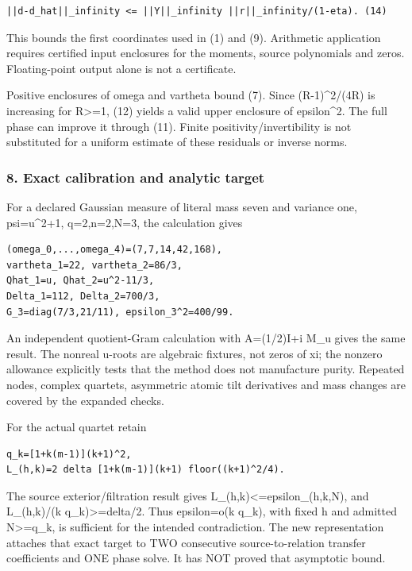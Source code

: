 \begin{verbatim}
||d-d_hat||_infinity <= ||Y||_infinity ||r||_infinity/(1-eta). (14)
\end{verbatim}

This bounds the first coordinates used in (1) and (9). Arithmetic application requires certified input enclosures for the moments, source polynomials and zeros. Floating-point output alone is not a certificate.

Positive enclosures of omega and vartheta bound (7). Since (R-1)\^{}2/(4R) is increasing for R\textgreater=1, (12) yields a valid upper enclosure of epsilon\^{}2. The full phase can improve it through (11). Finite positivity/invertibility is not substituted for a uniform estimate of these residuals or inverse norms.

\subsubsection{8. Exact calibration and analytic target}\label{endpoint-pr24_original--exact-calibration-and-analytic-target}

For a declared Gaussian measure of literal mass seven and variance one, psi=u\^{}2+1, q=2,n=2,N=3, the calculation gives

\begin{verbatim}
(omega_0,...,omega_4)=(7,7,14,42,168),
vartheta_1=22, vartheta_2=86/3,
Qhat_1=u, Qhat_2=u^2-11/3,
Delta_1=112, Delta_2=700/3,
G_3=diag(7/3,21/11), epsilon_3^2=400/99.
\end{verbatim}

An independent quotient-Gram calculation with A=(1/2)I+i M\_u gives the same result. The nonreal u-roots are algebraic fixtures, not zeros of xi; the nonzero allowance explicitly tests that the method does not manufacture purity. Repeated nodes, complex quartets, asymmetric atomic tilt derivatives and mass changes are covered by the expanded checks.

For the actual quartet retain

\begin{verbatim}
q_k=[1+k(m-1)](k+1)^2,
L_(h,k)=2 delta [1+k(m-1)](k+1) floor((k+1)^2/4).
\end{verbatim}

The source exterior/filtration result gives L\_(h,k)\textless=epsilon\_(h,k,N), and L\_(h,k)/(k q\_k)\textgreater=delta/2. Thus epsilon=o(k q\_k), with fixed h and admitted N\textgreater=q\_k, is sufficient for the intended contradiction. The new representation attaches that exact target to TWO consecutive source-to-relation transfer coefficients and ONE phase solve. It has NOT proved that asymptotic bound.

